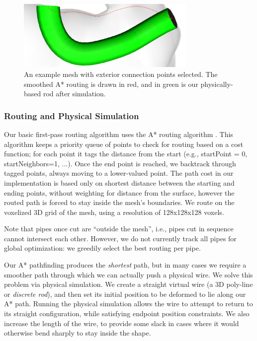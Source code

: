\begin{figure}[h!]
\centering
    \includegraphics[width=3.4in]{figures/exterior.png}
\caption{An example mesh with exterior connection points selected.  The smoothed A* routing is drawn in {\color{red}red}, and in {\color{tovi}green} is our physically-based rod after simulation.}
\label{fig:tool-process-exterior}
\end{figure}

\subsubsection{Routing and Physical Simulation}

Our basic first-pass routing algorithm uses the A* routing algorithm \cite{Hart-Astar}.  This algorithm keeps a priority queue of points to check for routing based on a cost function; for each point it tags the distance from the start (e.g., startPoint = 0, startNeighbors=1, ...).  Once the end point is reached, we backtrack through tagged points, always moving to a lower-valued point.  The path cost in our implementation is based only on shortest distance between the starting and ending points, without weighting for distance from the surface, however the routed path is forced to stay inside the mesh's boundaries.  We route on the voxelized 3D grid of the mesh, using a resolution of 128x128x128 voxels. 

Note that pipes once cut are ``outside the mesh'', i.e., pipes cut in sequence cannot intersect each other.  However, we do not currently track all pipes for global optimization: we greedily select the best routing per pipe.

Our A* pathfinding produces the \emph{shortest} path, but in many cases
we require a smoother path through which we can actually push a physical wire.
We solve this problem via physical simulation. We create a straight virtual 
wire (a 3D poly-line or \emph{discrete rod}), and then set its initial position 
to be deformed to lie along our A* path.
Running the physical simulation allows the wire to attempt to return to
its straight configuration, while satisfying endpoint position constraints.
We also increase the length of the wire, to provide some slack in cases where 
it would otherwise bend sharply to stay inside the shape. 

